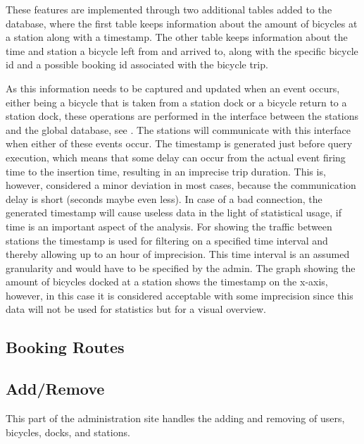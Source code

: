 These features are implemented through two additional tables added to the database, where the first table keeps information about the amount of bicycles at a station along with a timestamp. 
The other table keeps information about the time and station a bicycle left from and arrived to, along with the specific bicycle id and a possible booking id associated with the bicycle trip.

As this information needs to be captured and updated when an event occurs, either being a bicycle that is taken from a station dock or a bicycle return to a station dock, these operations are performed in the interface between the stations and the global database, see . 
The stations will communicate with this interface when either of these events occur. 
The timestamp is generated just before query execution, which means that some delay can occur from the actual event firing time to the insertion time, resulting in an imprecise trip duration. 
This is, however, considered a minor deviation in most cases, because the communication delay is short (seconds maybe even less).
In case of a bad connection, the generated timestamp will cause useless data in the light of statistical usage, if time is an important aspect of the analysis.
For showing the traffic between stations the timestamp is used for filtering on a specified time interval and thereby allowing up to an hour of imprecision.
This time interval is an assumed granularity and would have to be specified by the admin.
The graph showing the amount of bicycles docked at a station shows the timestamp on the x-axis, however, in this case it is considered acceptable with some imprecision since this data will not be used for statistics but for a visual overview.

\subsection{Booking Routes}

\subsection{Add/Remove}
This part of the administration site handles the adding and removing of users, bicycles, docks, and stations.

